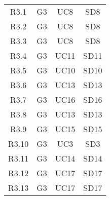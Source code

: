 \begin{longtable}[]{c c c c}
	R3.1 & G3 & UC8 & SD8 \\
	R3.2 & G3 & UC8 & SD8 \\
	R3.3 & G3 & UC8 & SD8 \\
	R3.4 & G3 & UC11 & SD11 \\
	R3.5 & G3 & UC10 & SD10 \\
	R3.6 & G3 & UC13 & SD13 \\
	R3.7 & G3 & UC16 & SD16\\
	R3.8 & G3 & UC13 & SD13\\
	R3.9 & G3 & UC15 & SD15\\
	R3.10 & G3 & UC3 & SD3 \\
	R3.11 & G3 & UC14 & SD14\\
	R3.12 & G3 & UC17 & SD17\\
	R3.13 & G3 & UC17 & SD17\\

	
	
\end{longtable}


